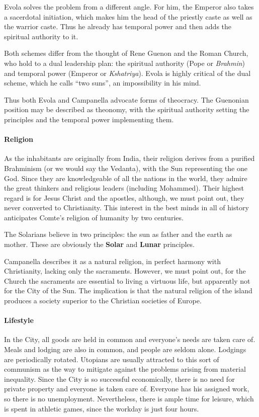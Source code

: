 Evola solves the problem from a different angle. For him, the Emperor also takes a sacerdotal initiation, which makes him the head of the priestly caste as well as the warrior caste. Thus he already has temporal power and then adds the spiritual authority to it.

Both schemes differ from the thought of Rene Guenon and the Roman Church, who hold to a dual leadership plan: the spiritual authority (Pope or \emph{Brahmin}) and temporal power (Emperor or
\emph{Kshatriya}). Evola is highly critical of the dual scheme, which he calls ``two suns'', an impossibility in his mind.

Thus both Evola and Campanella advocate forms of theocracy. The Guenonian position may be described as theonomy, with the spiritual authority setting the principles and the temporal power implementing them.

\paragraph{Religion}


As the inhabitants are originally from India, their religion derives from a purified Brahminism (or we would say the Vedanta), with the Sun representing the one God. Since they are knowledgeable of all the nations in the world, they admire the great thinkers and religious leaders (including Mohammed). Their highest regard is for Jesus Christ and the apostles, although, we must point out, they never converted to Christianity. This interest in the best minds in all of history anticipates Comte's religion of humanity by two centuries.

The Solarians believe in two principles: the sun as father and the earth as mother. These are obviously the \textbf{Solar} and \textbf{Lunar} principles.

Campanella describes it as a natural religion, in perfect harmony with Christianity, lacking only the sacraments. However, we must point out, for the Church the sacraments are essential to living a virtuous life, but apparently not for the City of the Sun. The implication is that the natural religion of the island produces a society superior to the Christian societies of Europe.

\paragraph{Lifestyle}


In the City, all goods are held in common and everyone's needs are taken care of. Meals and lodging are also in common, and people are seldom alone. Lodgings are periodically rotated. Utopians are usually attracted to this sort of communism as the way to mitigate against the problems arising from material inequality. Since the City is so successful economically, there is no need for private property and everyone is taken care of. Everyone has his assigned work, so there is no unemployment. Nevertheless, there is ample time for leisure, which is spent in athletic games, since the workday is just four hours.

